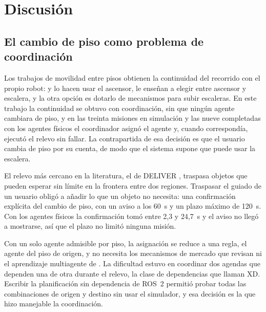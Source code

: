 \chapter{Discusión}
\label{cap:discusion}

\section{El cambio de piso como problema de coordinación}

Los trabajos de movilidad entre pisos obtienen la continuidad del recorrido con el propio robot: \textcite{kim2024indoor} y \textcite{song2024elevator} lo hacen usar el ascensor, \textcite{luo2025elevator} le enseñan a elegir entre ascensor y escalera, y la otra opción es dotarlo de mecanismos para subir escaleras. En este trabajo la continuidad se obtuvo con coordinación, sin que ningún agente cambiara de piso, y en las treinta misiones en simulación y las nueve completadas con los agentes físicos el coordinador asignó el agente y, cuando correspondía, ejecutó el relevo sin fallar. La contrapartida de esa decisión es que el usuario cambia de piso por su cuenta, de modo que el sistema supone que puede usar la escalera.

El relevo más cercano en la literatura, el de DELIVER \autocite{srivastava2026deliver}, traspasa objetos que pueden esperar sin límite en la frontera entre dos regiones. Traspasar el guiado de un usuario obligó a añadir lo que un objeto no necesita: una confirmación explícita del cambio de piso, con un aviso a los 60~s y un plazo máximo de 120~s. Con los agentes físicos la confirmación tomó entre 2,3 y 24,7~s y el aviso no llegó a mostrarse, así que el plazo no limitó ninguna misión.

Con un solo agente admisible por piso, la asignación se reduce a una regla, el agente del piso de origen, y no necesita los mecanismos de mercado que revisan \textcite{quinton2023market} ni el aprendizaje multiagente de \textcite{xu2026modular}. La dificultad estuvo en coordinar dos agendas que dependen una de otra durante el relevo, la clase de dependencias que \textcite{korsah2013comprehensive} llaman XD. Escribir la planificación sin dependencia de ROS~2 permitió probar todas las combinaciones de origen y destino sin usar el simulador, y esa decisión es la que hizo manejable la coordinación.

